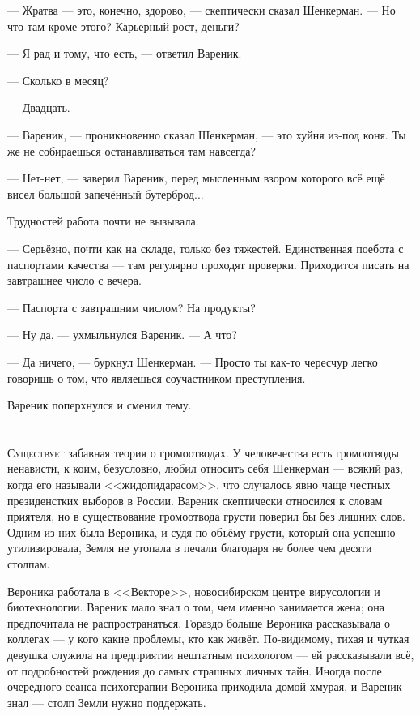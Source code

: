 \asterism

\textspace

--- Жратва --- это, конечно, здорово, --- скептически сказал Шенкерман.
--- Но что там кроме этого?
Карьерный рост, деньги?

--- Я рад и тому, что есть, --- ответил Вареник.

--- Сколько в месяц?

--- Двадцать.

--- Вареник, --- проникновенно сказал Шенкерман, --- это хуйня из-под коня.
Ты же не собираешься останавливаться там навсегда?

--- Нет-нет, --- заверил Вареник, перед мысленным взором которого всё ещё висел большой запечённый бутерброд...

Трудностей работа почти не вызывала.

--- Серьёзно, почти как на складе, только без тяжестей.
Единственная поебота с паспортами качества --- там регулярно проходят проверки.
Приходится писать на завтрашнее число с вечера.

--- Паспорта с завтрашним числом?
На продукты?

--- Ну да, --- ухмыльнулся Вареник.
--- А что?

--- Да ничего, --- буркнул Шенкерман.
--- Просто ты как-то чересчур легко говоришь о том, что являешься соучастником преступления.

Вареник поперхнулся и сменил тему.

\chapter{}

\lettrine[lines=4,slope=0pt,nindent=3pt]{С}{уществует} забавная теория о громоотводах.
У человечества есть громоотводы ненависти, к коим, безусловно, любил относить себя Шенкерман --- всякий раз, когда его называли <<жидопидарасом>>, что случалось явно чаще честных президенстких выборов в России.
Вареник скептически относился к словам приятеля, но в существование громоотвода грусти поверил бы без лишних слов.
Одним из них была Вероника, и судя по объёму грусти, который она успешно утилизировала, Земля не утопала в печали благодаря не более чем десяти столпам.

Вероника работала в <<Векторе>>, новосибирском центре вирусологии и биотехнологии.
Вареник мало знал о том, чем именно занимается жена;
она предпочитала не распространяться.
Гораздо больше Вероника рассказывала о коллегах --- у кого какие проблемы, кто как живёт.
По-видимому, тихая и чуткая девушка служила на предприятии нештатным психологом --- ей рассказывали всё, от подробностей рождения до самых страшных личных тайн.
Иногда после очередного сеанса психотерапии Вероника приходила домой хмурая, и Вареник знал --- столп Земли нужно поддержать.

